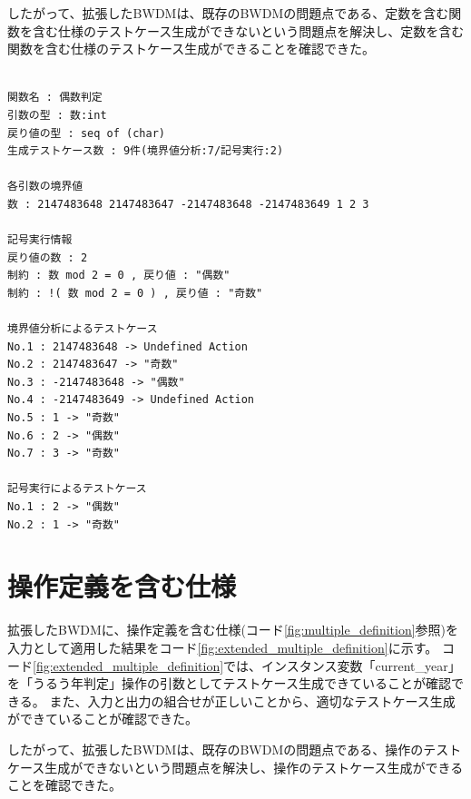 \documentclass[uplatex, report, a4j, 10pt]{jsbook}
\begin{document}
したがって、拡張したBWDMは、既存のBWDMの問題点である、定数を含む関数を含む仕様のテストケース生成ができないという問題点を解決し、定数を含む関数を含む仕様のテストケース生成ができることを確認できた。

\lstset{language=}
\noindent\begin{minipage}{\textwidth}
  \begin{lstlisting}[caption=拡張したBWDMに、定数を含む関数を含む仕様(コード\ref{fig:func_multiple})を適用した際の出力,label=fig:extended_value_definition_result]

関数名 : 偶数判定
引数の型 : 数:int 
戻り値の型 : seq of (char)
生成テストケース数 : 9件(境界値分析:7/記号実行:2)

各引数の境界値
数 : 2147483648 2147483647 -2147483648 -2147483649 1 2 3 

記号実行情報
戻り値の数 : 2
制約 : 数 mod 2 = 0 , 戻り値 : "偶数"
制約 : !( 数 mod 2 = 0 ) , 戻り値 : "奇数"

境界値分析によるテストケース
No.1 : 2147483648 -> Undefined Action
No.2 : 2147483647 -> "奇数"
No.3 : -2147483648 -> "偶数"
No.4 : -2147483649 -> Undefined Action
No.5 : 1 -> "奇数"
No.6 : 2 -> "偶数"
No.7 : 3 -> "奇数"

記号実行によるテストケース
No.1 : 2 -> "偶数"
No.2 : 1 -> "奇数"

\end{lstlisting}
\end{minipage}

\section{操作定義を含む仕様}
拡張したBWDMに、操作定義を含む仕様(コード\ref{fig:multiple_definition}参照)を入力として適用した結果をコード\ref{fig:extended_multiple_definition}に示す。
コード\ref{fig:extended_multiple_definition}では、インスタンス変数「current\_year」を「うるう年判定」操作の引数としてテストケース生成できていることが確認できる。
また、入力と出力の組合せが正しいことから、適切なテストケース生成ができていることが確認できた。

したがって、拡張したBWDMは、既存のBWDMの問題点である、操作のテストケース生成ができないという問題点を解決し、操作のテストケース生成ができることを確認できた。
\end{document}
